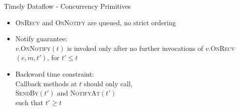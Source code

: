 \begin{frame}[t]{Timely Dataflow - Concurrency Primitives}

  \vspace{0.5cm}
  \begin{center}
  \end{center}

  \begin{itemize}
    \item \textsc{OnRecv} and \textsc{OnNotify} are queued, no strict ordering
    \vspace{0.25cm}
    \item Notify guarantee:
          \vspace{0.15cm}
          \\ $v$.\textsc{OnNotify}$(t)$ is invoked only after no further invocations of
          $v$.\textsc{OnRecv}$(e,m,t')$, for $t' \leq t$
          \vspace{0.25cm}
    \item Backward time constraint: 
          \vspace{0.15cm}
          \\ Callback methods at $t$ should only call,
          \\ \textsc{SendBy}$(t')$ and \textsc{NotifyAt}$(t')$ \\
          such that $t' \geq t$
  \end{itemize}

\end{frame}

